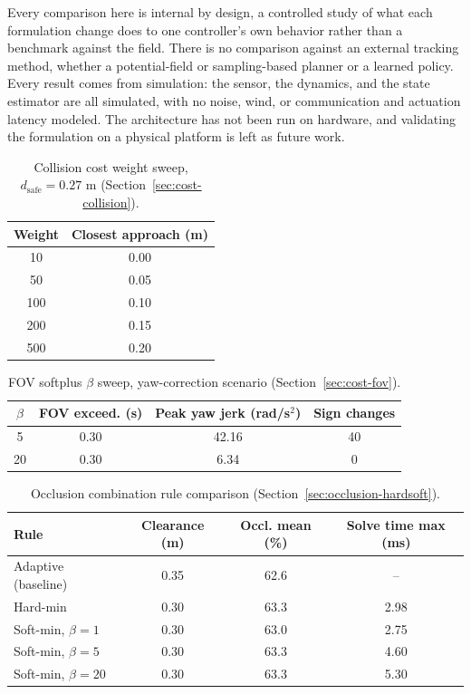 \documentclass[conference]{IEEEtran}
\begin{document}
Every comparison here is internal by design, a controlled study of what each formulation change does to one controller's own behavior rather than a benchmark against the field. There is no comparison against an external tracking method, whether a potential-field or sampling-based planner or a learned policy. Every result comes from simulation: the sensor, the dynamics, and the state estimator are all simulated, with no noise, wind, or communication and actuation latency modeled. The architecture has not been run on hardware, and validating the formulation on a physical platform is left as future work.

\appendix

\begin{table}[t]
\centering
\caption{Collision cost weight sweep, $d_{\text{safe}}=0.27$ m (Section~\ref{sec:cost-collision}).}
\label{tab:weightsweep}
\begin{tabular}{cc}
\hline
Weight & Closest approach (m) \\
\hline
10 & 0.00 \\
50 & 0.05 \\
100 & 0.10 \\
200 & 0.15 \\
500 & 0.20 \\
\hline
\end{tabular}
\end{table}

\begin{table}[t]
\centering
\caption{FOV softplus $\beta$ sweep, yaw-correction scenario (Section~\ref{sec:cost-fov}).}
\label{tab:beta}
\begin{tabular}{cccc}
\hline
$\beta$ & FOV exceed. (s) & Peak yaw jerk (rad/s$^2$) & Sign changes \\
\hline
5  & 0.30 & 42.16 & 40 \\
20 & 0.30 & 6.34  & 0  \\
\hline
\end{tabular}
\end{table}

\begin{table}[t]
\centering
\caption{Occlusion combination rule comparison (Section~\ref{sec:occlusion-hardsoft}).}
\label{tab:hardsoft}
\begin{tabular}{lccc}
\hline
Rule & Clearance (m) & Occl. mean (\%) & Solve time max (ms) \\
\hline
Adaptive (baseline) & 0.35 & 62.6 & -- \\
Hard-min & 0.30 & 63.3 & 2.98 \\
Soft-min, $\beta=1$ & 0.30 & 63.0 & 2.75 \\
Soft-min, $\beta=5$ & 0.30 & 63.3 & 4.60 \\
Soft-min, $\beta=20$ & 0.30 & 63.3 & 5.30 \\
\hline
\end{tabular}
\end{table}
\end{document}

